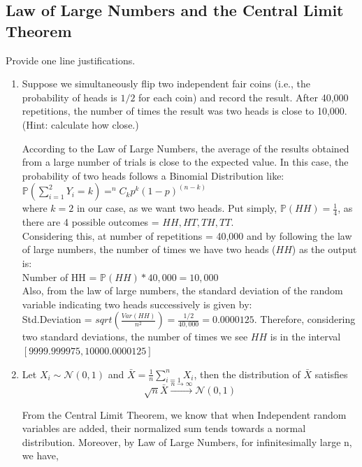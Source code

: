 \documentclass[a4paper]{article}
\theoremstyle{definition}
\newenvironment{soln}{
    \leavevmode\color{blue}\ignorespaces
}{}
\begin{document}
\subsection{Law of Large Numbers and the Central Limit Theorem}
Provide one line justifications.
\begin{enumerate}
\item Suppose we simultaneously flip two independent fair coins (i.e., the probability of heads is $1/2$ for each coin)
  and record the result. After 40,000 repetitions, the number
  of times the result was two heads is close to 10,000.  (Hint: calculate how close.)
  
  \begin{soln}
  	According to the Law of Large Numbers, the average of the results obtained from a large number of trials is close to the expected value. In this case, the probability of two heads follows a Binomial Distribution like: \\
  	$\mathbb{P}(\sum_{i=1}^{2} Y_i = k) = ^nC_k p^k (1-p)^(n-k)$ \\
  	where $k = 2$ in our case, as we want two heads. Put simply, $\mathbb{P}(HH) = \frac{1}{4}$, as there are 4 possible outcomes = $ {HH, HT, TH, TT} $. \\ 
  	Considering this, at number of repetitions = 40,000 and by following the law of large numbers, the number of times we have two heads ($HH$) as the output is: \\
	Number of HH = $\mathbb{P}(HH) *	 40,000 = 10,000$ \\
	Also, from the law of large numbers, the standard deviation of the random variable indicating two heads successively is given by: \\
	Std.Deviation = $sqrt(\frac{Var(HH)}{n^2}) = \frac{1/2}{40,000} = 0.0000125$. Therefore, considering two standard deviations, the number of times we see $HH$ is in the interval $[9999.999975, 10000.0000125]$
  	
  \end{soln}
  
\item Let $X_i\sim\mathcal{N}(0, 1)$ and $\bar{X} = \frac{1}{n}\sum_{i=1}^n X_i$, then the distribution of $\bar{X}$ satisfies 
  $$\sqrt{n}\bar{X}\overset{n\rightarrow\infty}{\longrightarrow}\mathcal{N}(0, 1)$$
  \begin{soln}  
	From the Central Limit Theorem, we know that when Independent random variables are added, their normalized sum tends towards a normal distribution.  Moreover, by Law of Large Numbers, for infinitesimally large n, we have, \\
	

\end{soln}
\end{enumerate}
\end{document}
